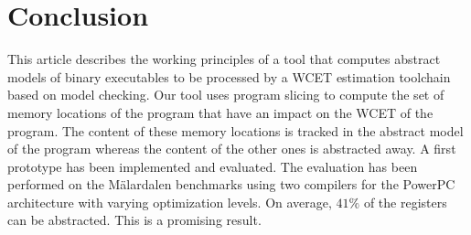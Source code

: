 \section{Conclusion}
\label{sec:conclusion}

  This article describes the working principles of a tool that computes abstract
  models of binary executables to be processed by a WCET estimation toolchain
  based on model checking. Our tool uses program slicing to compute the set of
  memory locations of the program that have an impact on the WCET of the
  program. The content of these memory locations is tracked in the abstract
  model of the program whereas the content of the other ones is abstracted away.
  A first prototype has been implemented and evaluated. The evaluation has been
  performed on the Mälardalen benchmarks using two compilers for the PowerPC
  architecture with varying optimization levels. On average, $41\%$ of the
  registers can be abstracted. This is a promising result.

